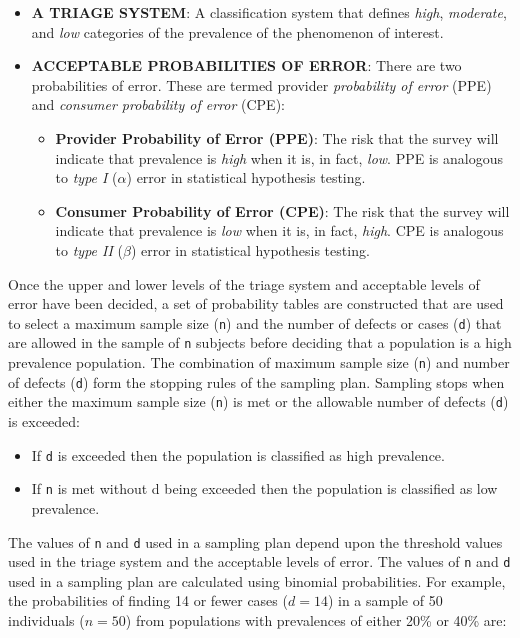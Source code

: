 \documentclass[12pt,a4paper]{book}
\theoremstyle{definition}
\theoremstyle{definition}
\theoremstyle{definition}
\theoremstyle{remark}
\begin{document}
\begin{itemize}
\item
  \textbf{A TRIAGE SYSTEM}: A classification system that defines
  \emph{high}, \emph{moderate}, and \emph{low} categories of the
  prevalence of the phenomenon of interest.
\item
  \textbf{ACCEPTABLE PROBABILITIES OF ERROR}: There are two
  probabilities of error. These are termed provider \emph{probability of
  error} (PPE) and \emph{consumer probability of error} (CPE):

  \begin{itemize}
  \item
    \textbf{Provider Probability of Error (PPE)}: The risk that the
    survey will indicate that prevalence is \emph{high} when it is, in
    fact, \emph{low}. PPE is analogous to \emph{type I} (\(\alpha\))
    error in statistical hypothesis testing.
  \item
    \textbf{Consumer Probability of Error (CPE)}: The risk that the
    survey will indicate that prevalence is \emph{low} when it is, in
    fact, \emph{high}. CPE is analogous to \emph{type II} (\(\beta\))
    error in statistical hypothesis testing.
  \end{itemize}
\end{itemize}

Once the upper and lower levels of the triage system and acceptable
levels of error have been decided, a set of probability tables are
constructed that are used to select a maximum sample size (\texttt{n})
and the number of defects or cases (\texttt{d}) that are allowed in the
sample of \texttt{n} subjects before deciding that a population is a
high prevalence population. The combination of maximum sample size
(\texttt{n}) and number of defects (\texttt{d}) form the stopping rules
of the sampling plan. Sampling stops when either the maximum sample size
(\texttt{n}) is met or the allowable number of defects (\texttt{d}) is
exceeded:

\begin{itemize}
\item
  If \texttt{d} is exceeded then the population is classified as high
  prevalence.
\item
  If \texttt{n} is met without d being exceeded then the population is
  classified as low prevalence.
\end{itemize}

The values of \texttt{n} and \texttt{d} used in a sampling plan depend
upon the threshold values used in the triage system and the acceptable
levels of error. The values of \texttt{n} and \texttt{d} used in a
sampling plan are calculated using binomial probabilities. For example,
the probabilities of finding 14 or fewer cases (\(d = 14\)) in a sample
of 50 individuals (\(n = 50\)) from populations with prevalences of
either 20\% or 40\% are:
\end{document}
